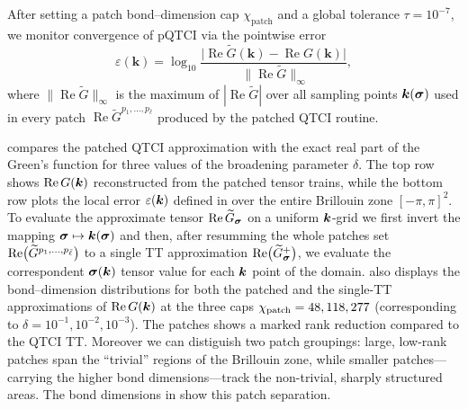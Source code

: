 After setting a patch bond–dimension cap \(\chi_{\text{patch}}\) and a global tolerance \(\tau=10^{-7}\), we monitor convergence of pQTCI via the pointwise error
\begin{equation}
  \varepsilon(\mathbf{k})
  = \log_{10}\!
      \frac{\bigl|\operatorname{Re}\widetilde G(\mathbf{k})
                -\operatorname{Re}G(\mathbf{k})\bigr|}
           {\;\|\operatorname{Re}\widetilde G\|_{\infty}},
  \label{eq:localError2DGreen}
\end{equation}
where \(\|\operatorname{Re}\widetilde G\|_{\infty}\) is the maximum of \(|\operatorname{Re}\widetilde G|\) over all sampling points \(\boldsymbol{k}(\boldsymbol{\sigma})\) used in every patch \(\operatorname{Re} \widetilde{G}^{p_1,\dots,p_{\bar\ell}}\) produced by the patched QTCI routine.

 compares the patched QTCI approximation with the exact real part of the Green’s function for three values of the
broadening parameter \(\delta\).  The top row shows
\(\operatorname{Re}G(\boldsymbol{k})\) reconstructed from the patched tensor trains, while the bottom row plots the local error \(\varepsilon(\boldsymbol{k})\) defined in  over the entire Brillouin zone \([-\pi,\pi]^{2}\). To evaluate the approximate tensor
\(\operatorname{Re}\widetilde{G}_{\boldsymbol{\sigma}}\) on a uniform \(\boldsymbol{k}\)-grid we first invert the mapping \(\boldsymbol{\sigma}\mapsto\boldsymbol{k}(\boldsymbol{\sigma})\) and then, after resumming the whole patches set $\text{Re}\bigl(\widetilde{G}^{p_1,\dots,p_{{\bar \ell}}}\bigr)$ to a single TT approximation $\text{Re}\bigl(\widetilde{G}_{\boldsymbol{\sigma}}^{+}\bigr)$, we evaluate the correspondent $\boldsymbol{\sigma}(\boldsymbol{k})$ tensor value for each $\boldsymbol{k}$ point of the domain.   also displays the bond–dimension distributions for both the patched and the single-TT approximations of \(\operatorname{Re}G(\boldsymbol{k})\)  at the three caps $\chi_{\text{patch}}=48,118,277$ (corresponding to  $\delta=10^{-1},10^{-2},10^{-3}$). The patches shows a marked rank reduction compared to the QTCI TT. Moreover we can distiguish two patch groupings: large, low-rank patches span the ``trivial'' regions of the Brillouin zone, while smaller patches—carrying the higher bond dimensions—track the non-trivial, sharply structured areas. The bond dimensions in show this patch separation.

